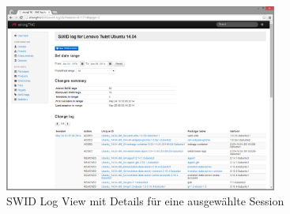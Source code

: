 \begin{figure}[H]
	\centering
	\includegraphics[width=0.8\textwidth]{./images/Views/log-view}
	\caption{SWID Log View mit Details für eine ausgewählte Session}
	\label{fig:log-view}
\end{figure}
